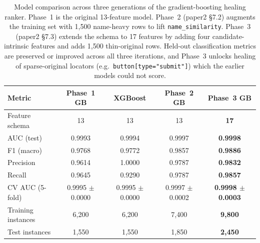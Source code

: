 \begin{table}[H]
\centering
\caption{Model comparison across three generations of the gradient-boosting healing ranker. Phase~1 is the original 13-feature model. Phase~2 (paper2 §7.2) augments the training set with 1{,}500 name-heavy rows to lift \texttt{name\_similarity}. Phase~3 (paper2 §7.3) extends the schema to 17 features by adding four candidate-intrinsic features and adds 1{,}500 thin-original rows. Held-out classification metrics are preserved or improved across all three iterations, and Phase~3 unlocks healing of sparse-original locators (e.g.\ \texttt{button[type="submit"]}) which the earlier models could not score.}
\label{tab:model_comparison}
\begin{tabular}{lcccc}
\toprule
Metric & \textbf{Phase~1 GB} & XGBoost & \textbf{Phase~2 GB} & \textbf{Phase~3 GB} \\
\midrule
Feature schema    & 13 & 13 & 13 & \textbf{17} \\
AUC (test)        & 0.9993 & 0.9994 & 0.9997 & \textbf{0.9998} \\
F1 (macro)        & 0.9768 & 0.9772 & 0.9857 & \textbf{0.9886} \\
Precision         & 0.9614 & 1.0000 & 0.9787 & \textbf{0.9832} \\
Recall            & 0.9645 & 0.9290 & 0.9787 & \textbf{0.9857} \\
CV AUC (5-fold)   & 0.9995 $\pm$ 0.0000 & 0.9995 $\pm$ 0.0000 & 0.9997 $\pm$ 0.0002 & \textbf{0.9998 $\pm$ 0.0003} \\
Training instances & 6{,}200 & 6{,}200 & 7{,}400 & \textbf{9{,}800} \\
Test instances    & 1{,}550 & 1{,}550 & 1{,}850 & \textbf{2{,}450} \\
\bottomrule
\end{tabular}
\end{table}
